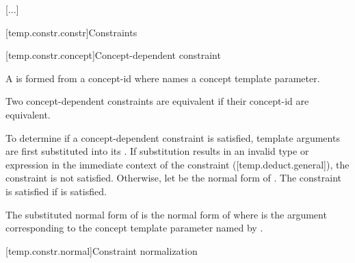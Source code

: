 \documentclass{wg21}
\begin{document}
\textcolor{noteclr}{[...]}

[temp.constr.constr]{Constraints}


\begin{addedblock}


[temp.constr.concept]{Concept-dependent constraint}

A  is formed from a concept-id 
where  names a concept template parameter.

Two concept-dependent constraints are equivalent if their concept-id are equivalent.


To determine if a concept-dependent constraint is satisfied, template arguments are first substituted into its
 . If substitution results in an invalid type or expression in the immediate context of the constraint ([temp.deduct.general]), the constraint is not satisfied.
Otherwise, let  be the normal form of .
The constraint is satisfied if  is satisfied.


The substituted normal form of  is the normal form of  where  is the argument
corresponding to the concept template parameter named by .

\end{addedblock}

[temp.constr.normal]{Constraint normalization}
%

%
\end{document}
